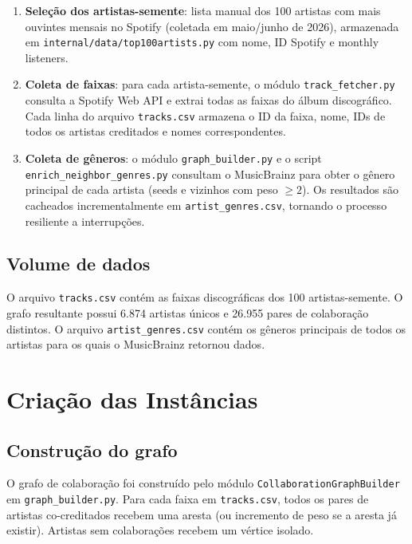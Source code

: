 \documentclass[12pt,a4paper]{article}
\begin{document}
\begin{enumerate}
    \item \textbf{Seleção dos artistas-semente}: lista manual dos 100 artistas com mais ouvintes mensais no Spotify (coletada em maio/junho de 2026), armazenada em \texttt{internal/data/top100artists.py} com nome, ID Spotify e monthly listeners.

    \item \textbf{Coleta de faixas}: para cada artista-semente, o módulo \texttt{track\_fetcher.py} consulta a Spotify Web API e extrai todas as faixas do álbum discográfico. Cada linha do arquivo \texttt{tracks.csv} armazena o ID da faixa, nome, IDs de todos os artistas creditados e nomes correspondentes.

    \item \textbf{Coleta de gêneros}: o módulo \texttt{graph\_builder.py} e o script \texttt{enrich\_neighbor\_genres.py} consultam o MusicBrainz para obter o gênero principal de cada artista (seeds e vizinhos com peso $\geq 2$). Os resultados são cacheados incrementalmente em \texttt{artist\_genres.csv}, tornando o processo resiliente a interrupções.
\end{enumerate}

\subsection{Volume de dados}

O arquivo \texttt{tracks.csv} contém as faixas discográficas dos 100 artistas-semente. O grafo resultante possui 6.874 artistas únicos e 26.955 pares de colaboração distintos. O arquivo \texttt{artist\_genres.csv} contém os gêneros principais de todos os artistas para os quais o MusicBrainz retornou dados.

\section{Criação das Instâncias}

\subsection{Construção do grafo}

O grafo de colaboração foi construído pelo módulo \texttt{CollaborationGraphBuilder} em \texttt{graph\_builder.py}. Para cada faixa em \texttt{tracks.csv}, todos os pares de artistas co-creditados recebem uma aresta (ou incremento de peso se a aresta já existir). Artistas sem colaborações recebem um vértice isolado.
\end{document}
